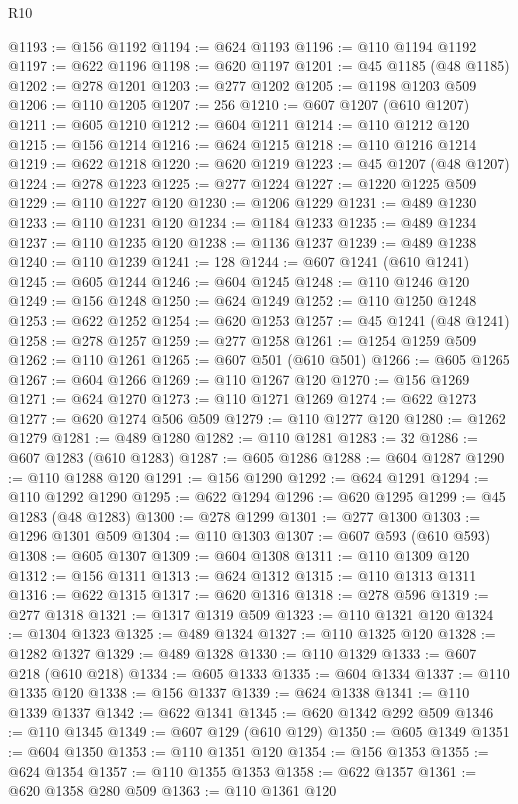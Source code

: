 \begin{lexlean}{R10}
\begin{coremodule}
{{{{{{{{{{{{{{{{{{{{{{{{{{{{{{{{{{{{{{{{{{{{{{{{{{{{{{{{{{{{{{{{{{{{{{{{{{{{{{{{{{{{@1193 := @156 @1192
@1194 := @624 @1193
@1196 := @110 @1194 @1192
@1197 := @622 @1196
@1198 := @620 @1197
@1201 := @45 @1185 (@48 @1185)
@1202 := @278 @1201
@1203 := @277 @1202
@1205 := @1198 @1203 @509
@1206 := @110 @1205
@1207 := 256
@1210 := @607 @1207 (@610 @1207)
@1211 := @605 @1210
@1212 := @604 @1211
@1214 := @110 @1212 @120
@1215 := @156 @1214
@1216 := @624 @1215
@1218 := @110 @1216 @1214
@1219 := @622 @1218
@1220 := @620 @1219
@1223 := @45 @1207 (@48 @1207)
@1224 := @278 @1223
@1225 := @277 @1224
@1227 := @1220 @1225 @509
@1229 := @110 @1227 @120
@1230 := @1206 @1229
@1231 := @489 @1230
@1233 := @110 @1231 @120
@1234 := @1184 @1233
@1235 := @489 @1234
@1237 := @110 @1235 @120
@1238 := @1136 @1237
@1239 := @489 @1238
@1240 := @110 @1239
@1241 := 128
@1244 := @607 @1241 (@610 @1241)
@1245 := @605 @1244
@1246 := @604 @1245
@1248 := @110 @1246 @120
@1249 := @156 @1248
@1250 := @624 @1249
@1252 := @110 @1250 @1248
@1253 := @622 @1252
@1254 := @620 @1253
@1257 := @45 @1241 (@48 @1241)
@1258 := @278 @1257
@1259 := @277 @1258
@1261 := @1254 @1259 @509
@1262 := @110 @1261
@1265 := @607 @501 (@610 @501)
@1266 := @605 @1265
@1267 := @604 @1266
@1269 := @110 @1267 @120
@1270 := @156 @1269
@1271 := @624 @1270
@1273 := @110 @1271 @1269
@1274 := @622 @1273
@1277 := @620 @1274 @506 @509
@1279 := @110 @1277 @120
@1280 := @1262 @1279
@1281 := @489 @1280
@1282 := @110 @1281
@1283 := 32
@1286 := @607 @1283 (@610 @1283)
@1287 := @605 @1286
@1288 := @604 @1287
@1290 := @110 @1288 @120
@1291 := @156 @1290
@1292 := @624 @1291
@1294 := @110 @1292 @1290
@1295 := @622 @1294
@1296 := @620 @1295
@1299 := @45 @1283 (@48 @1283)
@1300 := @278 @1299
@1301 := @277 @1300
@1303 := @1296 @1301 @509
@1304 := @110 @1303
@1307 := @607 @593 (@610 @593)
@1308 := @605 @1307
@1309 := @604 @1308
@1311 := @110 @1309 @120
@1312 := @156 @1311
@1313 := @624 @1312
@1315 := @110 @1313 @1311
@1316 := @622 @1315
@1317 := @620 @1316
@1318 := @278 @596
@1319 := @277 @1318
@1321 := @1317 @1319 @509
@1323 := @110 @1321 @120
@1324 := @1304 @1323
@1325 := @489 @1324
@1327 := @110 @1325 @120
@1328 := @1282 @1327
@1329 := @489 @1328
@1330 := @110 @1329
@1333 := @607 @218 (@610 @218)
@1334 := @605 @1333
@1335 := @604 @1334
@1337 := @110 @1335 @120
@1338 := @156 @1337
@1339 := @624 @1338
@1341 := @110 @1339 @1337
@1342 := @622 @1341
@1345 := @620 @1342 @292 @509
@1346 := @110 @1345
@1349 := @607 @129 (@610 @129)
@1350 := @605 @1349
@1351 := @604 @1350
@1353 := @110 @1351 @120
@1354 := @156 @1353
@1355 := @624 @1354
@1357 := @110 @1355 @1353
@1358 := @622 @1357
@1361 := @620 @1358 @280 @509
@1363 := @110 @1361 @120
}}}}}}}}}}}}}}}}}}}}}}}}}}}}}}}}}}}}}}}}}}}}}}}}}}}}}}}}}}}}}}}}}}}}}}}}}}}}}}}}}}}}
\end{coremodule}
\end{lexlean}
